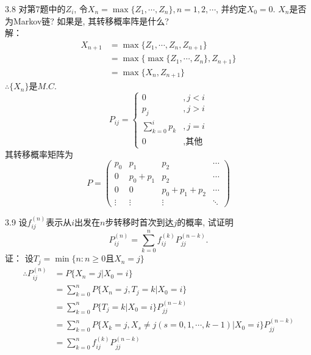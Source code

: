 3.8 对第7题中的$Z_i$, 令$X_n = \max \{Z_1, \cdots , Z_n\}, n = 1, 2, \cdots$, 并约定$X_0 = 0$. $X_n$是否为Markov链? 如果是, 其转移概率阵是什么?\\
解：\\
\begin{align*}
X_{n+1} & = \max \{Z_1, \cdots, Z_n, Z_{n+1}\}\\
		& = \max \{\max\{Z_1, \cdots, Z_n\}, Z_{n+1}\}\\
		& = \max \{X_n, Z_{n+1}\}
\end{align*}
$\therefore \{X_n\}$是$M.C.$\\
\[
P_{ij} =
\begin{cases}
0 & , j < i\\
p_j & , j > i\\
\sum\limits^i_{k=0}p_k & , j = i\\
0 & , \text{其他}
\end{cases}
\]
其转移概率矩阵为
\[
P =
\begin{pmatrix}
p_0 & p_1 & p_2 & \cdots \\
0 & p_0+p_1 & p_2 & \cdots \\
0 & 0 & p_0+p_1+p_2 & \cdots \\
\vdots & \vdots & \vdots & \ddots
\end{pmatrix}
\]


3.9 设$f^{(n)}_{ij}$表示从$i$出发在$n$步转移时首次到达$j$的概率, 试证明
\[
P^{(n)}_{ij} = \sum^n_{k=0}f^{(k)}_{ij}P^{(n-k)}_{jj}.
\]
证：
设$T_j = \min \{n: n \geqslant 0 \text{且} X_n = j\}$\\
\[
\begin{split}
\therefore P^{(n)}_{ij} & = P\{X_n = j | X_0 = i\}\\
				& = \sum^n_{k=0}P\{X_n = j, T_j = k | X_0 = i\}\\
				& = \sum^n_{k=0}P\{T_j = k | X_0 = i\}P^{(n-k)}_{jj}\\
				& = \sum^n_{k=0}P\{X_k = j, X_s\neq j(s = 0,1,\cdots, k-1) | X_0 = i\}P^{(n-k)}_{jj}\\
				& = \sum^n_{k=0}f^{(k)}_{ij} P^{(n-k)}_{jj}
\end{split}
\]


